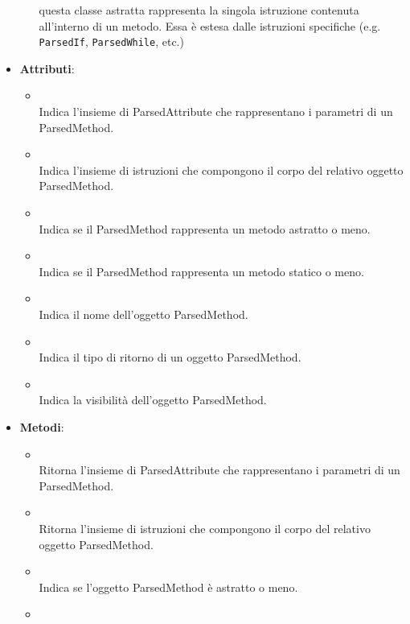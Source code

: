 \begin{itemize}
\begin{itemize}
questa classe astratta rappresenta la singola istruzione contenuta all'interno di un metodo. Essa è estesa dalle istruzioni specifiche (e.g. \texttt{ParsedIf}, \texttt{ParsedWhile}, etc.)
\end{itemize}
\item \textbf{Attributi}:
\begin{itemize}
\item {}
\\ Indica l'insieme di ParsedAttribute che rappresentano i parametri di un ParsedMethod.
\item {}
\\ Indica l'insieme di istruzioni che compongono il corpo del relativo oggetto ParsedMethod.
\item {}
\\ Indica se il ParsedMethod rappresenta un metodo astratto o meno.
\item {}
\\ Indica se il ParsedMethod rappresenta un metodo statico o meno.
\item {}
\\ Indica il nome dell'oggetto ParsedMethod.
\item {}
\\ Indica il tipo di ritorno di un oggetto ParsedMethod.
\item {}
\\ Indica la visibilità dell'oggetto ParsedMethod.
\end{itemize}
\item \textbf{Metodi}:
\begin{itemize}
\item {}
\\ Ritorna l'insieme di ParsedAttribute che rappresentano i parametri di un ParsedMethod.
\item {}
\\ Ritorna l'insieme di istruzioni che compongono il corpo del relativo oggetto ParsedMethod.
\item {}
\\ Indica se l'oggetto ParsedMethod è astratto o meno.
\item {}

\end{itemize}
\end{itemize}
